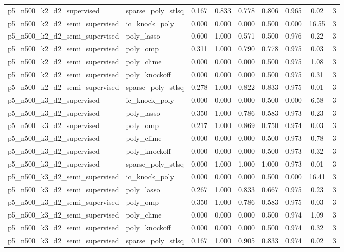\documentclass[12pt,a4paper]{article}
\begin{document}
\begin{table}[htbp]
{\begin{tabular}{llccccccc}
  p5\_n500\_k2\_d2\_supervised & sparse\_poly\_stlsq & 0.167 & 0.833 & 0.778 & 0.806 & 0.965 & 0.02 & 3 \\
  p5\_n500\_k2\_d2\_semi\_supervised & ic\_knock\_poly & 0.000 & 0.000 & 0.000 & 0.500 & 0.000 & 16.55 & 3 \\
  p5\_n500\_k2\_d2\_semi\_supervised & poly\_lasso & 0.600 & 1.000 & 0.571 & 0.500 & 0.976 & 0.22 & 3 \\
  p5\_n500\_k2\_d2\_semi\_supervised & poly\_omp & 0.311 & 1.000 & 0.790 & 0.778 & 0.975 & 0.03 & 3 \\
  p5\_n500\_k2\_d2\_semi\_supervised & poly\_clime & 0.000 & 0.000 & 0.000 & 0.500 & 0.975 & 1.08 & 3 \\
  p5\_n500\_k2\_d2\_semi\_supervised & poly\_knockoff & 0.000 & 0.000 & 0.000 & 0.500 & 0.975 & 0.31 & 3 \\
  p5\_n500\_k2\_d2\_semi\_supervised & sparse\_poly\_stlsq & 0.278 & 1.000 & 0.822 & 0.833 & 0.975 & 0.01 & 3 \\
  p5\_n500\_k3\_d2\_supervised & ic\_knock\_poly & 0.000 & 0.000 & 0.000 & 0.500 & 0.000 & 6.58 & 3 \\
  p5\_n500\_k3\_d2\_supervised & poly\_lasso & 0.350 & 1.000 & 0.786 & 0.583 & 0.973 & 0.23 & 3 \\
  p5\_n500\_k3\_d2\_supervised & poly\_omp & 0.217 & 1.000 & 0.869 & 0.750 & 0.974 & 0.03 & 3 \\
  p5\_n500\_k3\_d2\_supervised & poly\_clime & 0.000 & 0.000 & 0.000 & 0.500 & 0.973 & 0.78 & 3 \\
  p5\_n500\_k3\_d2\_supervised & poly\_knockoff & 0.000 & 0.000 & 0.000 & 0.500 & 0.973 & 0.32 & 3 \\
  p5\_n500\_k3\_d2\_supervised & sparse\_poly\_stlsq & 0.000 & 1.000 & 1.000 & 1.000 & 0.973 & 0.01 & 3 \\
  p5\_n500\_k3\_d2\_semi\_supervised & ic\_knock\_poly & 0.000 & 0.000 & 0.000 & 0.500 & 0.000 & 16.41 & 3 \\
  p5\_n500\_k3\_d2\_semi\_supervised & poly\_lasso & 0.267 & 1.000 & 0.833 & 0.667 & 0.975 & 0.23 & 3 \\
  p5\_n500\_k3\_d2\_semi\_supervised & poly\_omp & 0.350 & 1.000 & 0.786 & 0.583 & 0.975 & 0.03 & 3 \\
  p5\_n500\_k3\_d2\_semi\_supervised & poly\_clime & 0.000 & 0.000 & 0.000 & 0.500 & 0.974 & 1.09 & 3 \\
  p5\_n500\_k3\_d2\_semi\_supervised & poly\_knockoff & 0.000 & 0.000 & 0.000 & 0.500 & 0.974 & 0.32 & 3 \\
  p5\_n500\_k3\_d2\_semi\_supervised & sparse\_poly\_stlsq & 0.167 & 1.000 & 0.905 & 0.833 & 0.974 & 0.02 & 3 \\
\hline
\end{tabular}%
}
\end{table}
\end{document}
